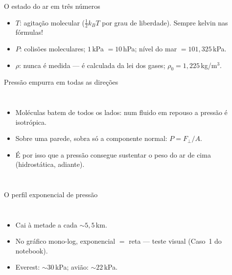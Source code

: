 \documentclass[aspectratio=169,11pt]{beamer}
\begin{document}
\begin{frame}{O estado do ar em três números}
  \vspace{0.5em}
  \begin{itemize}
    \item $T$: agitação molecular ($\tfrac12 k_B T$ por grau de liberdade).
          \alert{Sempre kelvin nas fórmulas!}
    \item $P$: colisões moleculares; $1$\,kPa $= 10$\,hPa;
          nível do mar $= 101{,}325$\,kPa.
    \item $\rho$: nunca é medida — é \alert{calculada} da lei dos gases;
          $\rho_0 = 1{,}225$\,kg/m$^3$.
  \end{itemize}
\end{frame}

\begin{frame}{Pressão empurra em todas as direções}
  \begin{columns}
    \begin{itemize}
      \item Moléculas batem de todos os lados: num fluido em repouso a
            pressão é \alert{isotrópica}.
      \item Sobre uma parede, sobra só a componente \alert{normal}:
            $P = F_\perp/A$.
      \item É por isso que a pressão consegue sustentar o peso do ar de
            cima (hidrostática, adiante).
    \end{itemize}
  \end{columns}
\end{frame}

\begin{frame}{O perfil exponencial de pressão}
  \begin{columns}
    \vspace{0.4em}
    \begin{itemize}
      \item Cai à metade a cada $\sim5{,}5$\,km.
      \item No gráfico mono-log, exponencial $=$ \alert{reta} — teste
            visual (Caso~1 do notebook).
      \item Everest: $\sim30$\,kPa; avião: $\sim22$\,kPa.
    \end{itemize}
  \end{columns}
\end{frame}
\end{document}
